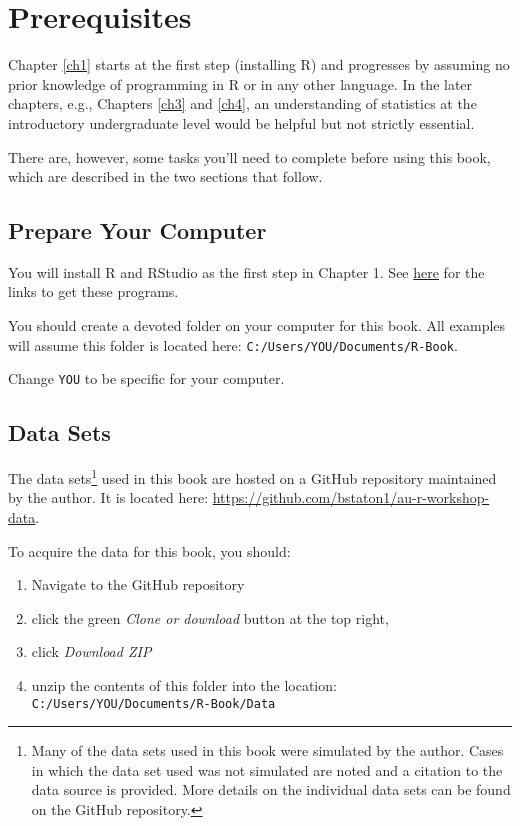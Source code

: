 \documentclass[]{book}
\providecommand{\tightlist}{%
  \setlength{\itemsep}{0pt}\setlength{\parskip}{0pt}}
\let\rmarkdownfootnote\footnote%
\def\footnote{\protect\rmarkdownfootnote}
\theoremstyle{definition}
\theoremstyle{definition}
\theoremstyle{definition}
\theoremstyle{remark}
\begin{document}
\section*{Prerequisites}\label{prerequisites}

Chapter \ref{ch1} starts at the first step (installing R) and progresses
by assuming no prior knowledge of programming in R or in any other
language. In the later chapters, e.g., Chapters \ref{ch3} and \ref{ch4},
an understanding of statistics at the introductory undergraduate level
would be helpful but not strictly essential.

There are, however, some tasks you'll need to complete before using this
book, which are described in the two sections that follow.

\subsection*{Prepare Your Computer}\label{comp-prep}

You will install R and RStudio as the first step in Chapter 1. See
\protect\hyperlink{install}{here} for the links to get these programs.

You should create a devoted folder on your computer for this book. All
examples will assume this folder is located here:
\texttt{C:/Users/YOU/Documents/R-Book}.

Change \texttt{YOU} to be specific for your computer.

\hypertarget{data-sets}{\subsection*{Data Sets}\label{data-sets}}

The data sets\footnote{Many of the data sets used in this book were
  simulated by the author. Cases in which the data set used was not
  simulated are noted and a citation to the data source is provided.
  More details on the individual data sets can be found on the GitHub
  repository.} used in this book are hosted on a GitHub repository
maintained by the author. It is located here:
\url{https://github.com/bstaton1/au-r-workshop-data}.

To acquire the data for this book, you should:

\begin{enumerate}
\def\labelenumi{\arabic{enumi}.}
\tightlist
\item
  Navigate to the GitHub repository
\item
  click the green \emph{Clone or download} button at the top right,
\item
  click \emph{Download ZIP}
\item
  unzip the contents of this folder into the location:
  \texttt{C:/Users/YOU/Documents/R-Book/Data}
\end{enumerate}
\end{document}
